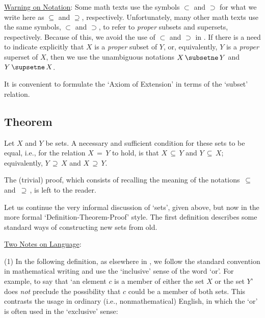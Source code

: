 \V

        \underline{Warning on Notation}: Some math texts use the symbols ${\subset}$ and ${\supset}$ for what we write here as ${\subseteq}$ and ${\supseteq}$, respectively.
    Unfortunately, many other math texts use the same symbols, ${\subset}$ and ${\supset}$, to refer to {\em proper} subsets and supersets, respectively.
    Because of this, we avoid the use of ${\subset}$ and ${\supset}$ in {\TheseNotes}.
    If there is a need to indicate explicitly that $X$ is a {\em proper} subset of $Y$, or, equivalently, $Y$ is a {\em proper} superset of $X$,
    then we use the unambiguous notations $X\,\subsetne\,Y$ and $Y\,\supsetne\,X$.

\V
\V

        It is convenient to formulate the `Axiom of Extension' in terms of the `subset' relation.



\V

            \subsection{\small{\bf Theorem}}
            \label{ThmA10.10}

        Let $X$ and $Y$ be sets. A necessary and sufficient condition for these sets to be equal, i.e., for the relation $X \,=\, Y$ to hold, is that $X \,{\subseteq}\, Y$ and $Y \,{\subseteq}\, X$;
    equivalently, $Y \,{\supseteq}\, X$ and $X \,{\supseteq}\, Y$.

\V

        The (trivial) proof, which consists of recalling the meaning of the notations $ \,{\subseteq}\, $ and $\,{\supseteq}\, $, is left to the reader.

\V
\V

        Let us continue the very informal discussion of `sets', given above, but  now in the more formal `Definition-Theorem-Proof' style.
    The first definition describes some standard ways of constructing new sets from old.

\V

        \underline{Two Notes on Language}:

\V

        (1) In the following definition,
    as elsewhere in {\TheseNotes}, we follow the standard convention in mathematical writing and use the `inclusive' sense of the word `or'.
    For example, to say that `an element $c$ is a member of either the set $X$ or the set $Y$'
    does {\em not} preclude the possibility that $c$ could be a member of both sets.
    This contrasts the usage in ordinary (i.e., nonmathematical) English, in which the `or' is often used in the `exclusive' sense:

